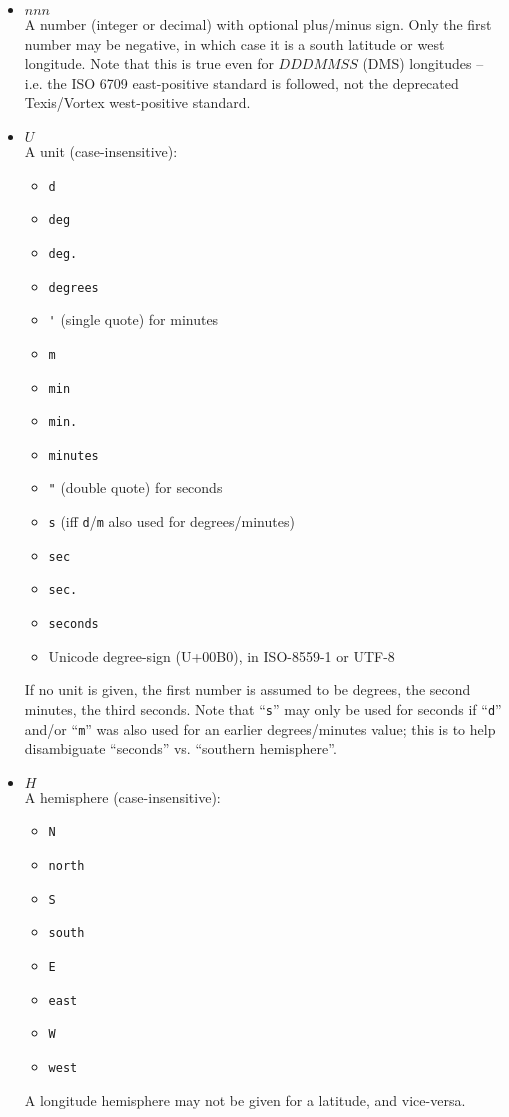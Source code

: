 \begin{itemize}
  \item $nnn$ \\

    A number (integer or decimal) with optional plus/minus sign.  Only
    the first number may be negative, in which case it is a south
    latitude or west longitude.  Note that this is true even for
    $DDDMMSS$ (DMS) longitudes -- i.e. the ISO 6709 east-positive
    standard is followed, not the deprecated Texis/Vortex
    west-positive standard.

  \item $U$ \\
    A unit (case-insensitive):
    \begin{itemize}
      \item \verb`d`
      \item \verb`deg`
      \item \verb`deg.`
      \item \verb`degrees`
      \item \verb`'` (single quote) for minutes
      \item \verb`m`
      \item \verb`min`
      \item \verb`min.`
      \item \verb`minutes`
      \item \verb`"` (double quote) for seconds
      \item \verb`s` (iff \verb`d`/\verb`m` also used for degrees/minutes)
      \item \verb`sec`
      \item \verb`sec.`
      \item \verb`seconds`
      \item Unicode degree-sign (U+00B0), in ISO-8559-1 or UTF-8
    \end{itemize}
    If no unit is given, the first number is assumed to be degrees,
    the second minutes, the third seconds.  Note that ``\verb`s`'' may
    only be used for seconds if ``\verb`d`'' and/or ``\verb`m`'' was
    also used for an earlier degrees/minutes value; this is to help
    disambiguate ``seconds'' vs. ``southern hemisphere''.

  \item $H$ \\
    A hemisphere (case-insensitive):
    \begin{itemize}
      \item \verb`N`
      \item \verb`north`
      \item \verb`S`
      \item \verb`south`
      \item \verb`E`
      \item \verb`east`
      \item \verb`W`
      \item \verb`west`
    \end{itemize}
    A longitude hemisphere may not be given for a latitude, and
    vice-versa.


\end{itemize}
